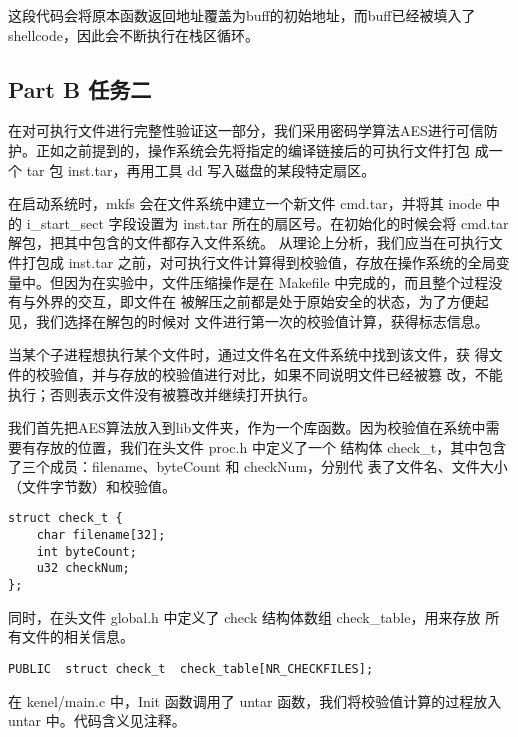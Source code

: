 \documentclass{whureport}
\begin{document}
这段代码会将原本函数返回地址覆盖为buff的初始地址，而buff已经被填入了shellcode，因此会不断执行在栈区循环。


\subsection{Part B 任务二}
在对可执行文件进行完整性验证这一部分，我们采用密码学算法AES进行可信防护。正如之前提到的，操作系统会先将指定的编译链接后的可执行文件打包 成一个 tar 包 inst.tar，再用工具 dd 写入磁盘的某段特定扇区。

在启动系统时，mkfs 会在文件系统中建立一个新文件 cmd.tar，并将其 inode 中的 i\_start\_sect 字段设置为 inst.tar 所在的扇区号。在初始化的时候会将 cmd.tar解包，把其中包含的文件都存入文件系统。 从理论上分析，我们应当在可执行文件打包成 inst.tar 之前，对可执行文件计算得到校验值，存放在操作系统的全局变量中。但因为在实验中，文件压缩操作是在 Makefile 中完成的，而且整个过程没有与外界的交互，即文件在 被解压之前都是处于原始安全的状态，为了方便起见，我们选择在解包的时候对 文件进行第一次的校验值计算，获得标志信息。

当某个子进程想执行某个文件时，通过文件名在文件系统中找到该文件，获 得文件的校验值，并与存放的校验值进行对比，如果不同说明文件已经被篡 改，不能执行；否则表示文件没有被篡改并继续打开执行。

我们首先把AES算法放入到lib文件夹，作为一个库函数。因为校验值在系统中需要有存放的位置，我们在头文件 proc.h 中定义了一个 结构体 check\_t，其中包含了三个成员：filename、byteCount 和 checkNum，分别代 表了文件名、文件大小（文件字节数）和校验值。

\begin{lstlisting}
struct check_t {
    char filename[32];
    int byteCount;
    u32 checkNum;
};
\end{lstlisting}


同时，在头文件 global.h 中定义了 check 结构体数组 check\_table，用来存放 所有文件的相关信息。

\begin{lstlisting}
PUBLIC	struct check_t	check_table[NR_CHECKFILES];
\end{lstlisting}

在 kenel/main.c 中，Init 函数调用了 untar 函数，我们将校验值计算的过程放入 untar 中。代码含义见注释。
\end{document}

